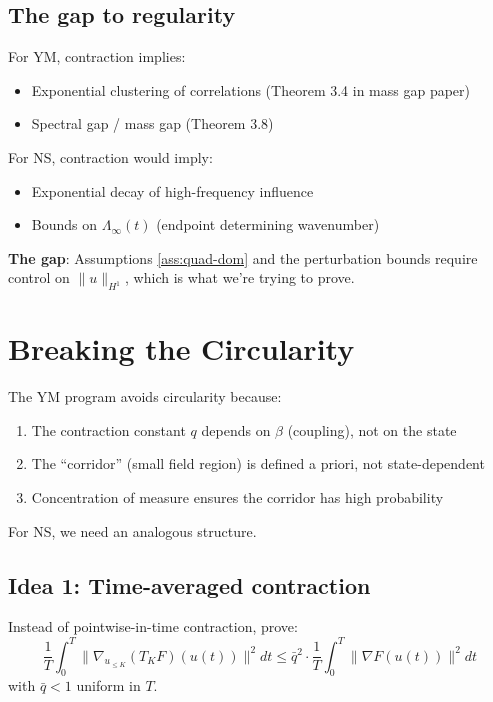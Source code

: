 \documentclass[11pt]{article}
\theoremstyle{definition}
\begin{document}
\subsection{The gap to regularity}

For YM, contraction implies:
\begin{itemize}
\item Exponential clustering of correlations (Theorem 3.4 in mass gap paper)
\item Spectral gap / mass gap (Theorem 3.8)
\end{itemize}

For NS, contraction would imply:
\begin{itemize}
\item Exponential decay of high-frequency influence
\item Bounds on $\Lambda_\infty(t)$ (endpoint determining wavenumber)
\end{itemize}

\textbf{The gap}: Assumptions \ref{ass:quad-dom} and the perturbation bounds require control 
on $\|u\|_{H^1}$, which is what we're trying to prove.

\section{Breaking the Circularity}

The YM program avoids circularity because:
\begin{enumerate}
\item The contraction constant $q$ depends on $\beta$ (coupling), not on the state
\item The ``corridor'' (small field region) is defined a priori, not state-dependent
\item Concentration of measure ensures the corridor has high probability
\end{enumerate}

For NS, we need an analogous structure.

\subsection{Idea 1: Time-averaged contraction}

Instead of pointwise-in-time contraction, prove:
\begin{equation}
\frac{1}{T} \int_0^T \|\nabla_{u_{\leq K}} (T_K F)(u(t))\|^2 dt \leq \bar{q}^2 \cdot 
\frac{1}{T} \int_0^T \|\nabla F(u(t))\|^2 dt
\end{equation}
with $\bar{q} < 1$ uniform in $T$.
\end{document}
